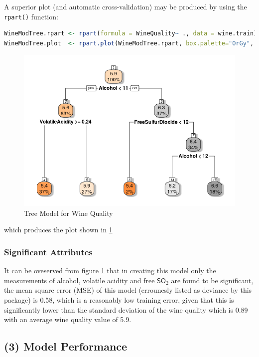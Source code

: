 \documentclass[
]{article}
\newcommand{\passthrough}[1]{#1}
\begin{document}
A superior plot (and automatic cross-validation) may be produced by
using the \passthrough{\lstinline!rpart()!} function:

\begin{lstlisting}[language=R]
WineModTree.rpart <- rpart(formula = WineQuality~ ., data = wine.train)
WineModTree.plot  <- rpart.plot(WineModTree.rpart, box.palette="OrGy", shadow.col="gray", nn=TRUE)
\end{lstlisting}

\begin{figure}
\centering
\includegraphics[width=0.7\linewidth]{SecAssignment_files/figure-html/tree-1.png}
\caption{Tree Model for Wine Quality}
\label{rpartregtree}
\end{figure}

which produces the plot shown in \ref{rpartregtree}


\hypertarget{significant-attributes}{%
\subsubsection{Significant Attributes}\label{significant-attributes}}

It can be oveserved from figure \ref{rpartregtree} that in creating this model
only the measurements of alcohol, volatile acidity and free $\textsf{SO}_2$ are found to be significant, the mean square error (MSE) of this
model (errounesly listed as deviance by this package) is 0.58, which is
a reasonably low training error, given that this is significantly lower
than the standard deviation of the wine quality which is 0.89 with an
average wine quality value of 5.9.

\newpage

\hypertarget{model-performance}{%
\subsection{(3) Model Performance}\label{model-performance}}
\end{document}
